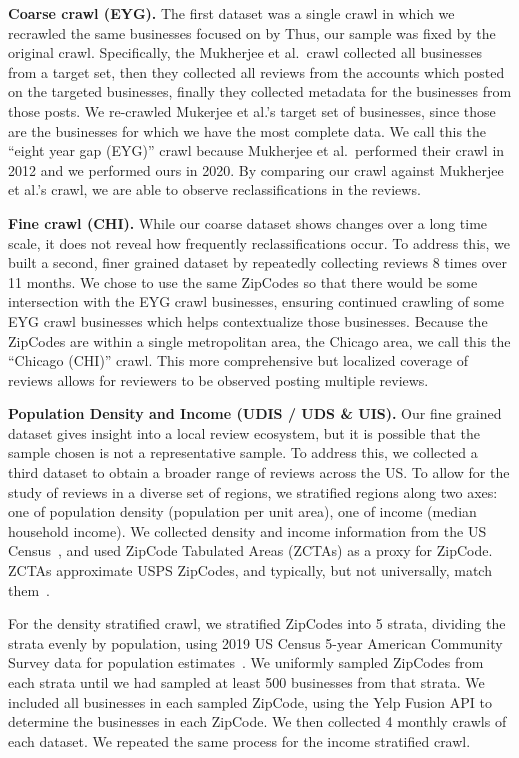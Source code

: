 \textbf{Coarse crawl (EYG).} 
The first dataset was a single crawl in which we recrawled the same businesses focused on by \citet{mukherjee2013yelp} Thus, our sample was fixed by the original crawl. Specifically, the Mukherjee et al.~crawl collected all businesses from a target set, then they collected all reviews from the accounts which posted on the targeted businesses, finally they collected metadata for the businesses from those posts. We re-crawled Mukerjee et al.'s target set of businesses, since those are the businesses for which we have the most complete data. We call this the ``eight year gap (EYG)'' crawl because Mukherjee et al.~performed their crawl in 2012 and we performed ours in 2020. By comparing our crawl against Mukherjee et al.'s crawl, we are able to observe reclassifications in the reviews.

\textbf{Fine crawl (CHI).} While our coarse dataset shows changes over a long time scale, it does not reveal how frequently reclassifications occur. To address this, we built a second, finer grained dataset by repeatedly collecting reviews 8 times over 11 months. We chose to use the same ZipCodes so that there would be some intersection with the EYG crawl businesses, ensuring continued crawling of some EYG crawl businesses which helps contextualize those businesses. Because the ZipCodes are within a single metropolitan area, the Chicago area, we call this the ``Chicago (CHI)'' crawl. This more comprehensive but localized coverage of reviews allows for reviewers to be observed posting multiple reviews.

\textbf{Population Density and Income (UDIS / UDS \& UIS).}
Our fine grained dataset gives insight into a local review ecosystem, but it is possible that the sample chosen is not a representative sample. To address this, we collected a third dataset to obtain a broader range of reviews across the US. To allow for the study of reviews in a diverse set of regions, we stratified regions along two axes: one of population density (population per unit area), one of income (median household income). We collected density and income information from the US Census~\cite{acs2019householdincome}, and used ZipCode Tabulated Areas (ZCTAs) as a proxy for ZipCode. ZCTAs approximate USPS ZipCodes, and typically, but not universally, match them~\cite{Census2020zctas}.

For the density stratified crawl, we stratified ZipCodes into 5 strata, dividing the strata evenly by population, using 2019 US Census 5-year American Community Survey data for population estimates~\cite{acs2019populationtotal}. We uniformly sampled ZipCodes from each strata until we had sampled at least 500 businesses from that strata. We included all businesses in each sampled ZipCode, using the Yelp Fusion API to determine the businesses in each ZipCode. We then collected 4 monthly crawls of each dataset. We repeated the same process for the income stratified crawl.

